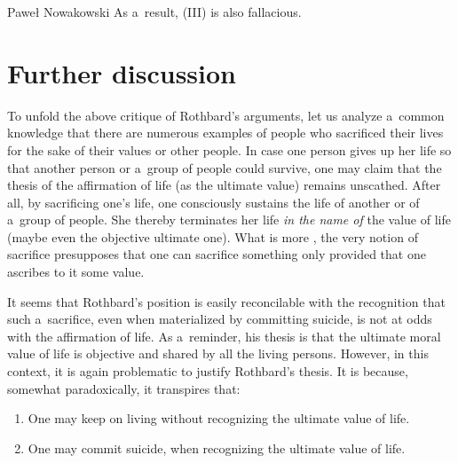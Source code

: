 \begin{artengenv}{Paweł Nowakowski}
As a~result, (III) is also fallacious.



\section{Further discussion}

To unfold the above critique of Rothbard's arguments, let us analyze a~common knowledge that there are numerous examples of people who sacrificed their lives for the sake of their values or other people. In case one person gives up her life so that another person or a~group of people could survive, one may claim that the thesis of the affirmation of life (as the ultimate value) remains unscathed. After all, by sacrificing one's life, one consciously sustains the life of another or of a~group of people. She thereby terminates her life \textit{in the name of} the value of life (maybe even the objective ultimate one). What is more 
\parencites[see][p.1]{Raz2017On}[][p.76]{Weiss1949Sacrifice}, %
 the very notion of sacrifice presupposes that one can sacrifice something only provided that one ascribes to it some value.



It seems that Rothbard's position is easily reconcilable with the recognition that such a~sacrifice, even when materialized by committing suicide, is not at odds with the affirmation of life. As a~reminder, his thesis is that the ultimate moral value of life is objective and shared by all the living persons. However, in this context, it is again problematic to justify Rothbard's thesis. It is because, somewhat paradoxically, it transpires that:



\begin{enumerate}[label=(\arabic*)]

\item  One may keep on living without recognizing the ultimate value of life.



\item One may commit suicide, when recognizing the ultimate value of life.

\end{enumerate}


\end{artengenv}
